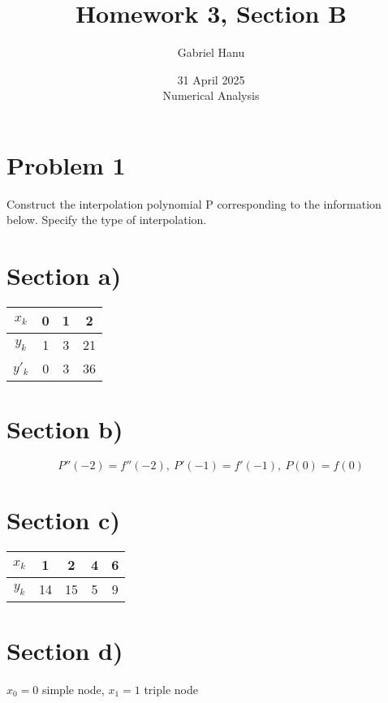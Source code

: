 \documentclass{article}
\title{Homework 3, Section B}
\author{Gabriel Hanu}
\date{31 April 2025 \\
Numerical Analysis}
\begin{document}
\maketitle

\section*{Problem 1}
Construct the interpolation polynomial P corresponding to the information below. Specify the type of interpolation.

\section*{Section a)}
\begin{center}
    \begin{tabular}{c| c c c}
        \(x_k\) & 0 & 1 & 2 \\
        \hline
        \(y_k\) & 1 & 3 & 21 \\
        \hline
        \(y'_k\) & 0 & 3 & 36 \\
    \end{tabular}
\end{center}

\section*{Section b)}
\[
    P''(-2) = f''(-2), \
    P'(-1) = f'(-1), \
    P(0) = f(0)
\]

\section*{Section c)}
\begin{center}
    \begin{tabular}{c| c c c c}
        \(x_k\) & 1 & 2 & 4 & 6 \\
        \hline
        \(y_k\) & 14 & 15 & 5 & 9 \\
    \end{tabular}
\end{center}

\section*{Section d)}
\begin{center}
    \(x_0 = 0\) simple node, \(x_1 = 1\) triple node
\end{center}
\end{document}
